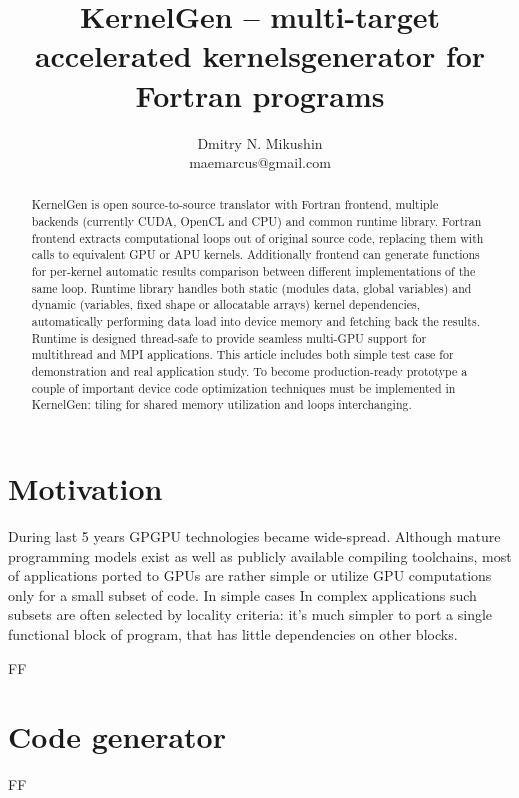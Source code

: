 \documentclass[a4,12pt]{article}
\title{KernelGen -- multi-target accelerated kernels\linebreak generator for Fortran programs}
\author{Dmitry N. Mikushin\\ maemarcus@gmail.com}
\begin{document}
\maketitle

\begin{abstract}

KernelGen is open source-to-source translator with Fortran frontend, multiple backends (currently CUDA, OpenCL and CPU) and common runtime library. Fortran frontend extracts computational loops out of original source code, replacing them with calls to equivalent GPU or APU kernels. Additionally frontend can generate functions for per-kernel automatic results comparison between different implementations of the same loop. Runtime library handles both static (modules data, global variables) and dynamic (variables, fixed shape or allocatable arrays) kernel dependencies, automatically performing data load into device memory and fetching back the results. Runtime is designed thread-safe to provide seamless multi-GPU support for multithread and MPI applications. This article includes both simple test case for demonstration and real application study. To become production-ready prototype a couple of important device code optimization techniques must be implemented in KernelGen: tiling for shared memory utilization and loops interchanging.

\end{abstract}

\section{Motivation}

During last 5 years GPGPU technologies became wide-spread. Although mature programming models exist as well as publicly available compiling toolchains, most of applications ported to GPUs are rather simple or utilize GPU computations only for a small subset of code. In simple cases   In complex applications such subsets are often selected by locality criteria: it's much simpler to port a single functional block of program, that has little dependencies on other blocks.

FF

\section{Code generator}

FF
\end{document}
